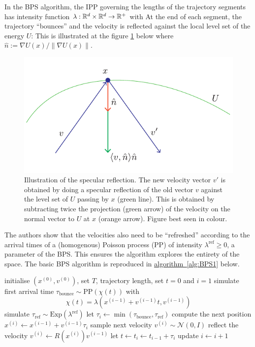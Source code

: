 In the BPS algorithm, the IPP governing the lengths of the trajectory segments has intensity function $\lambda:\mathbb R^{d}\times\mathbb R^{d}\to\mathbb R^{+}$ with
%
%
At the end of each segment, the trajectory ``bounces'' and the velocity is reflected against the local level set of the energy $U$:
This is illustrated at the figure \ref{fig:bounce-bps} below where $\hat n := \nabla U(x)/\|\nabla U(x)\|$.
%
%
\begin{figure}[!h]
	\center
	\includegraphics[width=.8\textwidth]{./figures/extra/bounce-bps}
	\caption{\label{fig:bounce-bps}Illustration of the specular reflection. The new velocity vector $v'$ is obtained by doing a specular reflection of the old vector $v$ against the level set of $U$ passing by $x$ (green line). This is obtained by subtracting twice the projection (green arrow) of the velocity on the normal vector to $U$ at $x$ (orange arrow). Figure best seen in colour.}
\end{figure}
%

The authors show that the velocities also need to be ``refreshed'' according to the arrival times of a (homogenous) Poisson process (PP) of intensity $\lambda^{\text{ref}}\ge 0$, a parameter of the BPS. This ensures the algorithm explores the entirety of the space. The basic BPS algorithm is reproduced in \hyperref[alg:BPS1]{algorithm~\ref*{alg:BPS1}} below.


\begin{algorithm}[!h]\small
	\caption{\label{alg:BPS1}\small {}}
	\begin{algorithmic}[1]
	\State initialise $(x^{(0)},v^{(0)})$, set $T$, trajectory length, set $t=0$ and $i=1$
		\State simulate first arrival time $\tau_{\text{bounce}} \sim \text{PP}(\chi(t))$  with
		$$ \chi(t) = \lambda(x^{(i-1)}+v^{(i-1)}t,v^{(i-1)})$$
		\State simulate $\tau_{\text{ref}}\sim \mathrm{Exp}(\lambda^{\text{ref}})$
		\State let $\tau_{i}\leftarrow \min(\tau_{\text{bounce}},\tau_{\text{ref}})$
		\State compute the next position $x^{(i)}\leftarrow x^{(i-1)}+v^{(i-1)}\tau_{i}$
			\State sample next velocity $v^{(i)}\sim \mathcal N(0,I)$		
			\State reflect the velocity $v^{(i)}\leftarrow R(x^{(i)})v^{(i-1)}$
		\EndIf
		\State let $t\leftarrow t_{i}\leftarrow t_{i-1}+\tau_{i}$
		\State update $i\leftarrow i+1$
	\EndWhile
	\end{algorithmic}
\end{algorithm}

